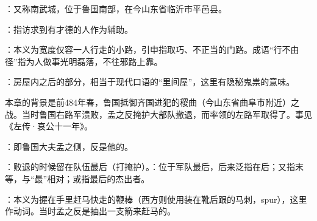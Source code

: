 {
\item {}：又称南武城，位于鲁国南部，在今山东省临沂市平邑县。
\item {}：指访求到有才德的人作为辅助。
\item {}：本义为宽度仅容一人行走的小路，引申指取巧、不正当的门路。成语“行不由径”指为人做事光明磊落，不往邪路上靠。
\item {}：房屋内之后的部分，相当于现代口语的“里间屋”，这里有隐秘鬼祟的意味。
}
{}  %


{本章的背景是前484年春，鲁国抵御齐国进犯的稷曲（今山东省曲阜市附近）之战。当时鲁国右路军溃败，孟之反掩护大部队撤退，而率领的左路军取得了。事见《左传·哀公十一年》。
\begin{lyblobitemize}
\item {}：即鲁国大夫孟之侧，反是他的。
\item {}：败退的时候留在队伍最后（打掩护）。：位于军队最后，后来泛指在后；又指末等，与“最”相对；或指最后的杰出者。

\item {}：本义为握在手里赶马快走的鞭棒（西方则使用装在靴后跟的马刺，spur），这里作动词。当时孟之反是抽出一支箭来赶马的。
\end{lyblobitemize}
}
{}


